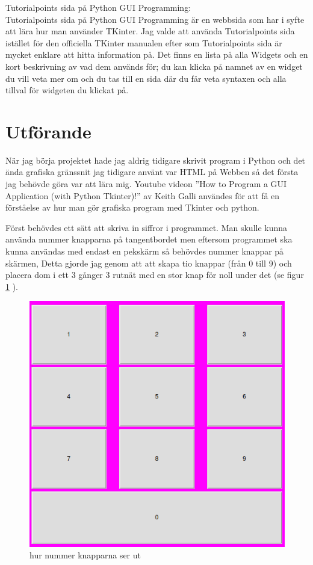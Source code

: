 \documentclass[a4paper, 12pt]{article}
\begin{document}
Tutorialpoints sida på Python GUI Programming:\\
Tutorialpoints sida på Python GUI Programming är en webbsida som har i syfte att lära hur man använder TKinter.
Jag valde att använda Tutorialpoints sida istället för den officiella TKinter manualen efter som Tutorialpoints sida är mycket enklare att hitta information på. Det finns en lista på alla Widgets och en kort beskrivning av vad dem används för; du kan klicka på namnet av en widget du vill veta mer om och du tas till en sida där du får veta syntaxen och alla tillval för widgeten du klickat på.

\section{Utförande}

När jag börja projektet hade jag aldrig tidigare skrivit program i Python och det ända grafiska gränssnit jag tidigare använt var HTML på Webben så det första jag behövde göra var att lära mig.
Youtube videon ''How to Program a GUI Application (with Python Tkinter)!'' av Keith Galli\cite{yt:galli} användes för att få en förståelse av hur man gör grafiska program med Tkinter och python. 


Först behövdes ett sätt att skriva in siffror i programmet.
Man skulle kunna använda nummer knapparna på tangentbordet men eftersom programmet ska kunna användas med endast en pekskärm så behövdes nummer knappar på skärmen, Detta gjorde jag genom att att skapa tio knappar (från 0 till 9)  och placera dom i ett 3 gånger 3 rutnät med en stor knap för noll under det (se figur \ref{fig:numpad} ).


\begin{figure}[h!]
  \includegraphics[width=\linewidth]{img/numpad.png}
  \caption{hur nummer knapparna ser ut}
  \label{fig:numpad}
\end{figure}
\end{document}
